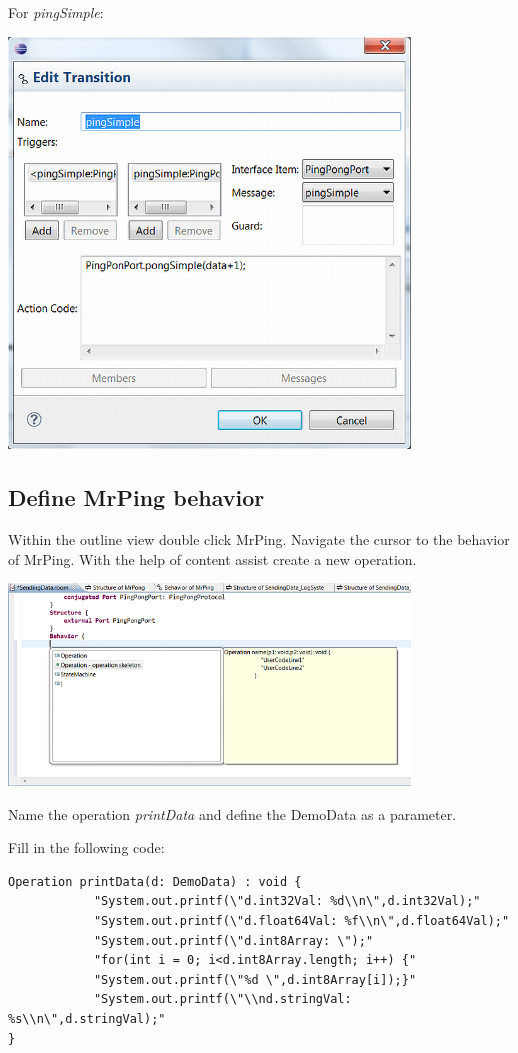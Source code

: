 For \textit{pingSimple}:

\includegraphics[width=0.8\textwidth]{images/025-SendingData06.png}


\subsection{Define MrPing behavior}

Within the outline view double click MrPing. Navigate the cursor to the behavior of MrPing. With the help of content assist create a new operation.

\includegraphics[width=0.8\textwidth]{images/025-SendingData07.png}

Name the operation \textit{printData} and define the DemoData as a parameter.

Fill in the following code:

\begin{small}
\begin{verbatim}
Operation printData(d: DemoData) : void {
            "System.out.printf(\"d.int32Val: %d\\n\",d.int32Val);"
            "System.out.printf(\"d.float64Val: %f\\n\",d.float64Val);"
            "System.out.printf(\"d.int8Array: \");"
            "for(int i = 0; i<d.int8Array.length; i++) {"
            "System.out.printf(\"%d \",d.int8Array[i]);}"
            "System.out.printf(\"\\nd.stringVal: %s\\n\",d.stringVal);"
}
\end{verbatim}
\end{small}

